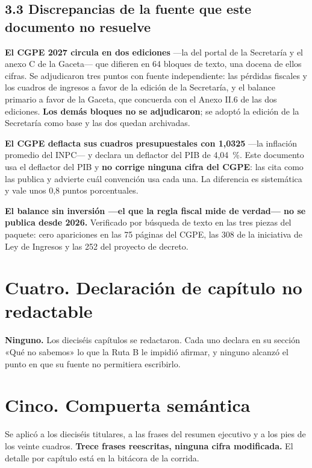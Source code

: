 \subsection*{3.3 Discrepancias de la fuente que este documento no resuelve}

\begin{list}{}{\setlength{\leftmargin}{1.4em}\setlength{\itemsep}{4pt}}
\item[$\bullet$] \textbf{El CGPE 2027 circula en dos ediciones} ---la del portal de la
Secretaría y el anexo C de la Gaceta--- que difieren en 64 bloques de texto, una docena de
ellos cifras. Se adjudicaron tres puntos con fuente independiente: las pérdidas fiscales y
los cuadros de ingresos a favor de la edición de la Secretaría, y el balance primario a favor
de la Gaceta, que concuerda con el Anexo II.6 de las dos ediciones. \textbf{Los demás bloques
no se adjudicaron}; se adoptó la edición de la Secretaría como base y las dos quedan
archivadas.
\item[$\bullet$] \textbf{El CGPE deflacta sus cuadros presupuestales con 1,0325} ---la
inflación promedio del INPC--- y declara un deflactor del PIB de 4,04~\%. Este documento usa
el deflactor del PIB y \textbf{no corrige ninguna cifra del CGPE}: las cita como las publica
y advierte cuál convención usa cada una. La diferencia es sistemática y vale unos 0,8 puntos
porcentuales.
\item[$\bullet$] \textbf{El balance sin inversión ---el que la regla fiscal mide de verdad---
no se publica desde 2026.} Verificado por búsqueda de texto en las tres piezas del paquete:
cero apariciones en las 75 páginas del CGPE, las 308 de la iniciativa de Ley de Ingresos y
las 252 del proyecto de decreto.
\end{list}

\section*{Cuatro. Declaración de capítulo no redactable}

\textbf{Ninguno.} Los dieciséis capítulos se redactaron. Cada uno declara en su sección «Qué
no sabemos» lo que la Ruta B le impidió afirmar, y ninguno alcanzó el punto en que su fuente
no permitiera escribirlo.

\section*{Cinco. Compuerta semántica}

Se aplicó a los dieciséis titulares, a las frases del resumen ejecutivo y a los pies de los
veinte cuadros. \textbf{Trece frases reescritas, ninguna cifra modificada.} El detalle
por capítulo está en la bitácora de la corrida.

